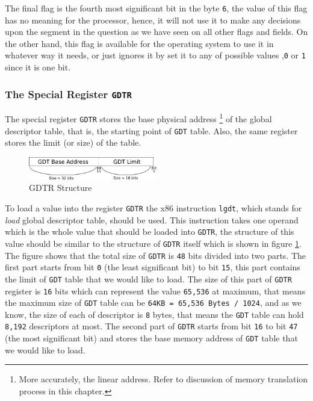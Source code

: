 The final flag is the fourth most significant bit in the byte
\lstinline!6!, the value of this flag has no meaning for the processor,
hence, it will not use it to make any decisions upon the segment in the
question as we have seen on all other flags and fields. On the other
hand, this flag is available for the operating system to use it in
whatever way it needs, or just ignores it by set it to any of possible
values ,\lstinline!0! or \lstinline!1! since it is one bit.

\subsubsection{\texorpdfstring{The Special Register
\texttt{GDTR}}{The Special Register GDTR}}\label{the-special-register-gdtr}

The special register \lstinline!GDTR! stores the base physical address
\footnote{More accurately, the linear address. Refer to discussion of
  memory translation process in this chapter.} of the global descriptor
table, that is, the starting point of \lstinline!GDT! table. Also, the
same register stores the limit (or size) of the table.

\begin{figure}
\centering
\includegraphics[width=0.50000\textwidth]{Figures/x86-ch/Fig16062021_0.png}
\caption{GDTR Structure}\label{fig:16062021_0}
\end{figure}

To load a value into the register \lstinline!GDTR! the x86 instruction
\lstinline!lgdt!, which stands for \emph{load} global descriptor table,
should be used. This instruction takes one operand which is the whole
value that should be loaded into \lstinline!GDTR!, the structure of this
value should be similar to the structure of \lstinline!GDTR! itself
which is shown in figure \ref{fig:16062021_0}. The figure shows that the
total size of \lstinline!GDTR! is \lstinline!48! bits divided into two
parts. The first part starts from bit \lstinline!0! (the least
significant bit) to bit \lstinline!15!, this part contains the limit of
\lstinline!GDT! table that we would like to load. The size of this part
of \lstinline!GDTR! register is \lstinline!16! bits which can represent
the value \lstinline!65,536! at maximum, that means the maximum size of
\lstinline!GDT! table can be \lstinline!64KB = 65,536 Bytes / 1024!, and
as we know, the size of each of descriptor is \lstinline!8! bytes, that
means the \lstinline!GDT! table can hold \lstinline!8,192! descriptors
at most. The second part of \lstinline!GDTR! starts from bit
\lstinline!16! to bit \lstinline!47! (the most significant bit) and
stores the base memory address of \lstinline!GDT! table that we would
like to load.

